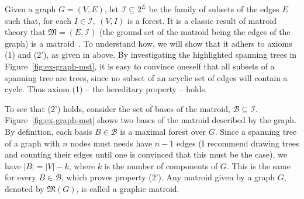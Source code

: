 Given a graph $G=(V,E)$, let $\mathcal{I} \subseteq 2^E$ be the family of subsets of the edges $E$ such that, for each $I \in \mathcal{I},\ (V, I)$ is a forest. It is a classic result of matroid theory that $\mathfrak{M} = (E, \mathcal{I})$ (the ground set of the matroid being the edges of the graph) is a matroid~\cite[p.~657]{schrijver-2003}. To understand how, we will show that it adhers to axioms (1) and (2'), as given in above. By investigating the highlighted spanning trees in Figure~\ref{fig:ex-graph-mst}, it is easy to convince oneself that all subsets of a spanning tree are trees, since no subset of an acyclic set of edges will contain a cycle. Thus axiom (1) -- the hereditary property -- holds. 

To see that (2') holds, consider the set of bases of the matroid, $\mathcal{B} \subseteq \mathcal{I}$. Figure~\ref{fig:ex-graph-mst} shows two bases of the matroid described by the graph. By definition, each basis $B \in \mathcal{B}$ is a maximal forest over $G$. Since a spanning tree of a graph with $n$ nodes must needs have $n-1$ edges (I recommend drawing trees and counting their edges until one is convinced that this must be the case), we have $|B| = |V| - k$, where $k$ is the number of components of $G$. This is the same for every $B \in \mathcal{B}$, which proves property (2'). Any matroid given by a graph $G$, denoted by $\mathfrak{M}(G)$, is called a graphic matroid.

